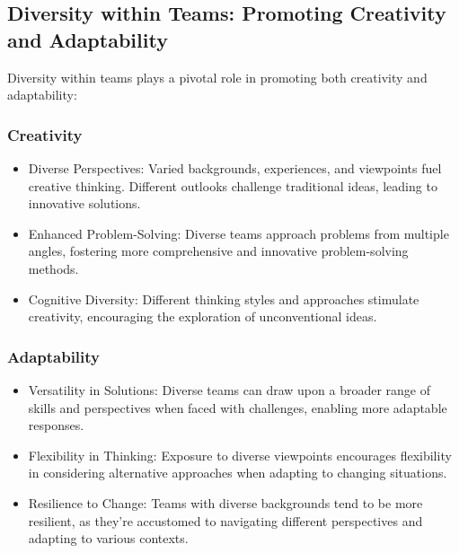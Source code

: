 \documentclass[a4paper, twoside]{article}
\begin{document}
\newpage
\subsection{Diversity within Teams: Promoting Creativity and Adaptability}

Diversity within teams plays a pivotal role in promoting both creativity and adaptability:

\subsubsection{Creativity}

\begin{itemize}
    \item{Diverse Perspectives:} Varied backgrounds, experiences, and viewpoints fuel creative thinking. Different outlooks challenge traditional ideas, leading to innovative solutions.
    
    \item{Enhanced Problem-Solving:} Diverse teams approach problems from multiple angles, fostering more comprehensive and innovative problem-solving methods.
    
    \item{Cognitive Diversity:} Different thinking styles and approaches stimulate creativity, encouraging the exploration of unconventional ideas.
\end{itemize}

\subsubsection{Adaptability}

\begin{itemize}
    \item{Versatility in Solutions:} Diverse teams can draw upon a broader range of skills and perspectives when faced with challenges, enabling more adaptable responses.
    
    \item{Flexibility in Thinking:} Exposure to diverse viewpoints encourages flexibility in considering alternative approaches when adapting to changing situations.
    
    \item{Resilience to Change:} Teams with diverse backgrounds tend to be more resilient, as they're accustomed to navigating different perspectives and adapting to various contexts.
\end{itemize}
\end{document}

